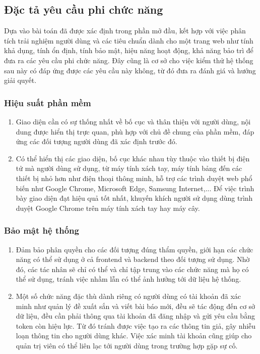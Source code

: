 \documentclass[./../main.tex]{subfiles}
\begin{document}
\subsection{Đặc tả yêu cầu phi chức năng}
Dựa vào bài toán đã được xác định trong phần mở đầu, kết hợp với việc phân tích trải nghiệm người dùng và các tiêu chuẩn dành cho một trang web như tính khả dụng, tính ổn định, tính bảo mật, hiệu năng hoạt động, khả năng bảo trì để đưa ra các yêu cầu phi chức năng. Đây cũng là cơ sở cho việc kiểm thử hệ thống sau này có đáp ứng được các yêu cầu này không, từ đó đưa ra đánh giá và hướng giải quyết.

\subsubsection{Hiệu suất phần mềm}
\begin{enumerate}
    \item Giao diện cần có sự thống nhất về bố cục và thân thiện với người dùng, nội dung được hiển thị trực quan, phù hợp với chủ đề chung của phần mềm, đáp ứng các đối tượng người dùng đã xác định trước đó.
    \item Có thể hiển thị các giao diện, bố cục khác nhau tùy thuộc vào thiết bị điện tử mà người dùng sử dụng, từ máy tính xách tay, máy tính bảng đến các thiết bị nhỏ hơn như điện thoại thông minh, hỗ trợ các trình duyệt web phổ biến như Google Chrome, Microsoft Edge, Samsung Internet,... Để việc trình bày giao diện đạt hiệu quả tốt nhất, khuyến khích người sử dụng dùng trình duyệt Google Chrome trên máy tính xách tay hay máy cây.
\end{enumerate}

\subsubsection{Bảo mật hệ thống}
\begin{enumerate}
    \item Đảm bảo phân quyền cho các đối tượng đúng thẩm quyền, giới hạn các chức năng có thể sử dụng ở cả frontend và backend theo đối tượng sử dụng. Nhờ đó, các tác nhân sẽ chỉ có thể và chỉ tập trung vào các chức năng mà họ có thể sử dụng, tránh việc nhầm lẫn có thể ảnh hưởng tới dữ liệu hệ thống.
    \item Một số chức năng đặc thù dành riêng có người dùng có tài khoản đã xác minh như quản lý đề xuất sắn và viết bài báo mới, đều sẽ tác động đến cơ sở dữ liệu, đều cần phải thông qua tài khoản đã đăng nhập và gửi yêu cầu bằng token còn hiệu lực. Từ đó tránh được việc tạo ra các thông tin giả, gây nhiễu loạn thông tin cho người dùng khác. Việc xác minh tài khoản cũng giúp cho quản trị viên có thể liên lạc tới người dùng trong trường hợp gặp sự cố.
\end{enumerate}
\end{document}
